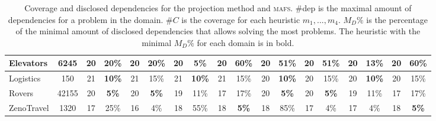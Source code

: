 \documentclass{article}
\newcommand{\mafs}{\textsc {mafs}\xspace}
\theoremstyle{remark}
\begin{document}
\begin{table}[ht]
{\begin{tabular}{|l|c||c|c|c|c|c|c|c|c||c|c|c|c|c|c|c|c|}
Elevators                                              & 6245                            & 20            & 20\%             & 20            & 20\%             & 20            & \textbf{5\%}     & 20            & 60\%             & 20            & 51\%             & 20            & 51\%             & 20            & \textbf{13\%}    & 20            & 60\%             \\ \hline
Logistics                                              & 150                             & 21            & \textbf{10\%}    & 21            & 15\%             & 21            & \textbf{10\%}    & 21            & 15\%             & 20            & \textbf{10\%}    & 20            & 15\%             & 20            & \textbf{10\%}    & 20            & 15\%             \\ \hline
Rovers                                                 & 42155                           & 20            & \textbf{5\%}     & 20            & \textbf{5\%}     & 19            & 11\%             & 17            & 17\%             & 20            & \textbf{5\%}     & 20            & \textbf{5\%}     & 19            & 11\%             & 17            & 17\%             \\ \hline
ZenoTravel                                             & 1320                            & 17            & 25\%             & 16            & 4\%              & 18            & 55\%             & 18            & \textbf{5\%}     & 18            & 85\%             & 17            & 4\%              & 17            & 4\%              & 18            & \textbf{5\%}     \\ \hline
\end{tabular}
}
\caption{
Coverage and disclosed dependencies for the projection method and \mafs.
\#dep is the maximal amount of dependencies for a problem in the domain.
$\#C$ is the coverage for each heuristic $m_1,...,m_4$. 
$M_D\%$ is the percentage of the minimal amount of disclosed dependencies that allows solving the most problems. 
The heuristic with the minimal $M_D\%$ for each domain is in bold.}
\label{table:CoverageTable}
\end{table}
\end{document}
